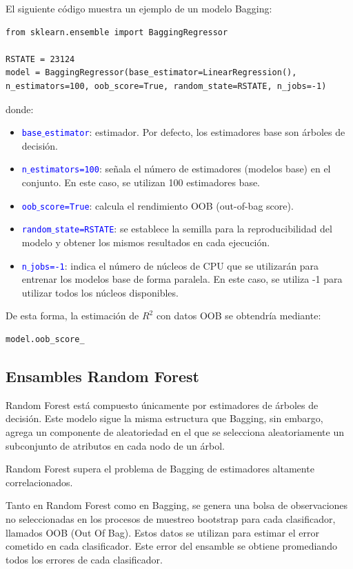 \documentclass[a4paper, 12pt]{book}
\begin{document}
El siguiente código muestra un ejemplo de un modelo Bagging:
\begin{verbatim}
from sklearn.ensemble import BaggingRegressor

RSTATE = 23124
model = BaggingRegressor(base_estimator=LinearRegression(), n_estimators=100, oob_score=True, random_state=RSTATE, n_jobs=-1)
\end{verbatim}
donde:
\begin{itemize}
	\item \texttt{\textcolor{blue}{base$\_$estimator}}: estimador. Por defecto, los estimadores base son árboles de decisión.
	\item \texttt{\textcolor{blue}{n$\_$estimators=100}}: señala el número de estimadores (modelos base) en el conjunto. En este caso, se utilizan 100 estimadores base.
	\item \texttt{\textcolor{blue}{oob$\_$score=True}}: calcula el rendimiento OOB (out-of-bag score).
	\item \texttt{\textcolor{blue}{random$\_$state=RSTATE}}: se establece la semilla para la reproducibilidad del modelo y obtener los mismos resultados en cada ejecución.
	\item \texttt{\textcolor{blue}{n$\_$jobs=-1}}: indica el número de núcleos de CPU que se utilizarán
	para entrenar los modelos base de forma paralela. En este caso, se utiliza -1 para utilizar todos los núcleos disponibles.
\end{itemize}
De esta forma, la estimación de $R^{2}$ con datos OOB se obtendría mediante:
\begin{verbatim}
model.oob_score_
\end{verbatim}

\subsection{Ensambles Random Forest}
Random Forest está compuesto únicamente por estimadores de árboles de decisión. Este modelo sigue la misma estructura que Bagging, sin embargo, agrega un componente de aleatoriedad en el que se selecciona aleatoriamente un subconjunto de atributos en cada nodo de un árbol.

Random Forest supera el problema de Bagging de estimadores altamente correlacionados.

Tanto en Random Forest como en Bagging, se genera una bolsa de observaciones no seleccionadas en los procesos de muestreo bootstrap para cada clasificador, llamados OOB (Out Of Bag). Estos datos se utilizan para estimar el error cometido en cada clasificador. Este error del ensamble se obtiene promediando todos los errores de cada clasificador.
\end{document}
